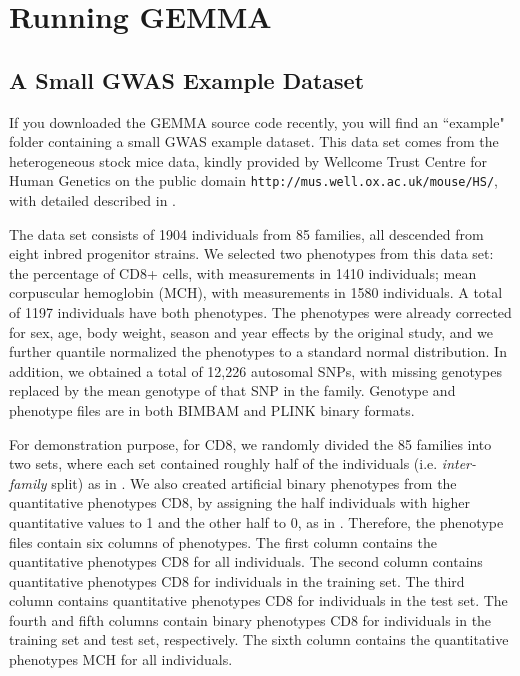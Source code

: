 \documentclass[11pt]{article}
\providecommand{\url}[1]{\texttt{#1}}
\begin{document}
\newpage
\section{Running GEMMA}

\subsection{A Small GWAS Example Dataset}
If you downloaded the GEMMA source code recently, you will find an ``example" folder containing a small GWAS example dataset. This data set comes from the heterogeneous stock mice data, kindly provided by Wellcome Trust Centre for Human Genetics on the public domain \url{http://mus.well.ox.ac.uk/mouse/HS/}, with detailed described in \cite{Valdar:2006}. 

The data set consists of 1904 individuals from 85 families, all descended from eight inbred progenitor strains. We selected two phenotypes from this data set: the percentage of CD8+ cells, with measurements in 1410 individuals; mean corpuscular hemoglobin (MCH), with measurements in 1580 individuals. A total of 1197 individuals have both phenotypes. The phenotypes were already corrected for sex, age, body weight, season and year effects by the original study, and we further quantile normalized the phenotypes to a standard normal distribution. In addition, we obtained a total of 12,226 autosomal SNPs, with missing genotypes replaced by the mean genotype of that SNP in the family. Genotype and phenotype files are in both BIMBAM and PLINK binary formats. 

For demonstration purpose, for CD8, we randomly divided the 85 families into two sets, where each set contained roughly half of the individuals (i.e. {\it inter-family} split) as in \cite{Zhou:2013}. We also created artificial binary phenotypes from the quantitative phenotypes CD8, by assigning the half individuals with higher quantitative values to 1 and the other half to 0, as in \cite{Zhou:2013}. Therefore, the phenotype files contain six columns of phenotypes. The first column contains the quantitative phenotypes CD8 for all individuals. The second column contains quantitative phenotypes CD8 for individuals in the training set. The third column contains quantitative phenotypes CD8 for individuals in the test set. The fourth and fifth columns contain binary phenotypes CD8 for individuals in the training set and test set, respectively. The sixth column contains the quantitative phenotypes MCH for all individuals.
\end{document}
